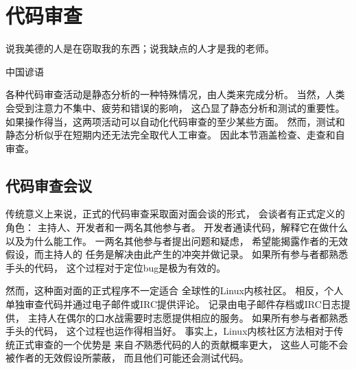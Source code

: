 \section{代码审查}
\label{sec:debugging:Code Review}
%
\epigraph{说我美德的人是在窃取我的东西；说我缺点的人才是我的老师。}
	 {中国谚语}

各种代码审查活动是静态分析的一种特殊情况，由人类来完成分析。
当然，人类会受到注意力不集中、疲劳和错误的影响，
这凸显了静态分析和测试的重要性。
如果操作得当，这两项活动可以自动化代码审查的至少某些方面。
然而，测试和静态分析似乎在短期内还无法完全取代人工审查。
因此本节涵盖检查、走查和自审查。

\subsection{代码审查会议}
\label{sec:debugging:Inspection}

传统意义上来说，正式的代码审查采取面对面会谈的形式，
会谈者有正式定义的角色：
主持人、开发者和一两名其他参与者。
开发者通读代码，解释它在做什么以及为什么能工作。
一两名其他参与者提出问题和疑虑，
希望能揭露作者的无效假设，而主持人的
任务是解决由此产生的冲突并做记录。
如果所有参与者都熟悉手头的代码，
这个过程对于定位bug是极为有效的。

然而，这种面对面的正式程序不一定适合
全球性的Linux内核社区。
相反，个人单独审查代码并通过电子邮件或IRC提供评论。
记录由电子邮件存档或IRC日志提供，
主持人在偶尔的口水战需要时志愿提供相应的服务。
如果所有参与者都熟悉手头的代码，
这个过程也运作得相当好。
事实上，Linux内核社区方法相对于传统正式审查的一个优势是
来自\emph{不}熟悉代码的人的贡献概率更大，
这些人可能不会被作者的无效假设所蒙蔽，
而且他们可能还会测试代码。

\QuickQuizEnd

